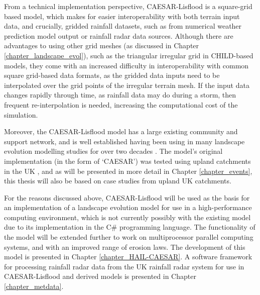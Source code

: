 From a technical implementation perspective, CAESAR-Lisflood is a square-grid based model, which makes for easier interoperability with both terrain input data, and crucially, gridded rainfall datasets, such as from numerical weather prediction model output or rainfall radar data sources. Although there are advantages to using other grid meshes (as discussed in Chapter \ref{chapter_landscape_evol}), such as the triangular irregular grid in CHILD-based models, they come with an increased difficulty in interoperability with common square grid-based data formats, as the gridded data inputs need to be interpolated over the grid points of the irregular terrain mesh. If the input data changes rapidly through time, as rainfall data may do during a storm, then frequent re-interpolation is needed, increasing the computational cost of the simulation.

%
Moreover, the CAESAR-Lisflood model has a large existing community and support network, and is well established having been using in many landscape evolution modelling studies for over two decades \citep{valters2016modelling}. The model's original implementation (in the form of `CAESAR') was tested using upland catchments in the UK \citep{coulthard1999modelling}, and as will be presented in more detail in Chapter \ref{chapter_events}, this thesis will also be based on case studies from upland UK catchments. 

For the reasons discussed above, CAESAR-Lisflood will be used as the basis for an implementation of a landscape evolution model for use in a high-performance computing environment, which is not currently possibly with the existing model due to its implementation in the C\# programming language. The functionality of the model will be extended further to work on multiprocessor parallel computing systems, and with an improved range of erosion laws. The development of this model is presented in Chapter \ref{chapter_HAIL-CAESAR}. A software framework for processing rainfall radar data from the UK rainfall radar system for use in CAESAR-Lisflood and derived models is presented in Chapter \ref{chapter_metdata}.

 
